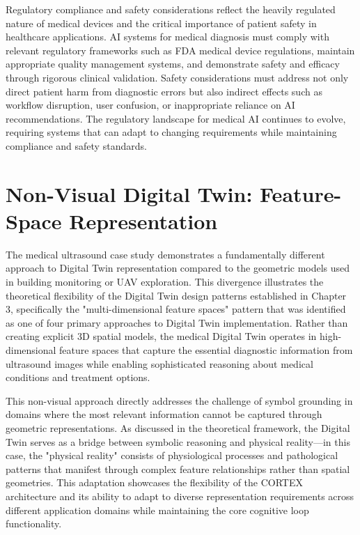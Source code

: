 Regulatory compliance and safety considerations reflect the heavily regulated nature of medical devices and the critical importance of patient safety in healthcare applications. AI systems for medical diagnosis must comply with relevant regulatory frameworks such as FDA medical device regulations, maintain appropriate quality management systems, and demonstrate safety and efficacy through rigorous clinical validation. Safety considerations must address not only direct patient harm from diagnostic errors but also indirect effects such as workflow disruption, user confusion, or inappropriate reliance on AI recommendations. The regulatory landscape for medical AI continues to evolve, requiring systems that can adapt to changing requirements while maintaining compliance and safety standards.

\section{Non-Visual Digital Twin: Feature-Space Representation}

The medical ultrasound case study demonstrates a fundamentally different approach to Digital Twin representation compared to the geometric models used in building monitoring or UAV exploration. This divergence illustrates the theoretical flexibility of the Digital Twin design patterns established in Chapter 3, specifically the "multi-dimensional feature spaces" pattern that was identified as one of four primary approaches to Digital Twin implementation. Rather than creating explicit 3D spatial models, the medical Digital Twin operates in high-dimensional feature spaces that capture the essential diagnostic information from ultrasound images while enabling sophisticated reasoning about medical conditions and treatment options.

This non-visual approach directly addresses the challenge of symbol grounding in domains where the most relevant information cannot be captured through geometric representations. As discussed in the theoretical framework, the Digital Twin serves as a bridge between symbolic reasoning and physical reality—in this case, the "physical reality" consists of physiological processes and pathological patterns that manifest through complex feature relationships rather than spatial geometries. This adaptation showcases the flexibility of the CORTEX architecture and its ability to adapt to diverse representation requirements across different application domains while maintaining the core cognitive loop functionality.


